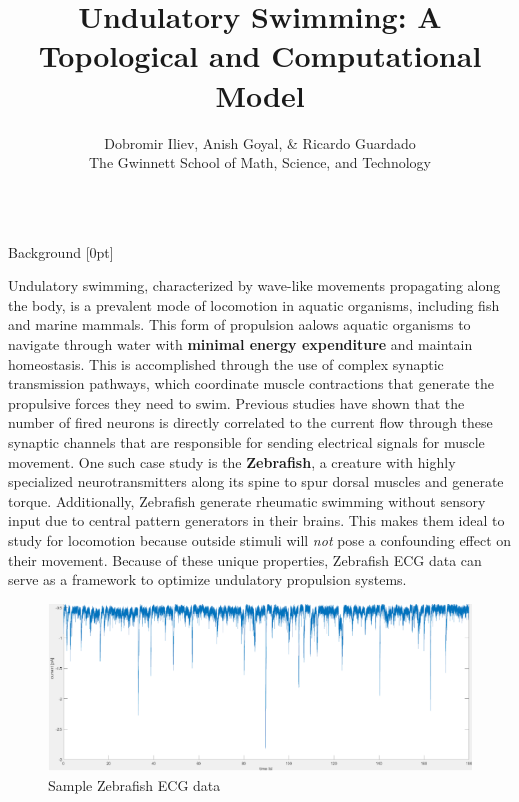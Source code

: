 \documentclass[final, 16pt]{beamer}
\title{Undulatory Swimming: A Topological and Computational Model}
\author{Dobromir Iliev, Anish Goyal, \& Ricardo Guardado \\\normalfont The Gwinnett School of Math, Science, and Technology}
\newlength{\colwidth}
\begin{document}
\setlength{\columnsep}{50pt}

\begin{frame}[t]
\centering
\vspace*{-0.5cm}
\begin{columns}[t]
\margincolumn

\fontsize{22}{26}\selectfont

\begin{column}{\colwidth}
  \fontsize{22}{24}\selectfont

  \begin{block}{Background}
    [0pt]

    Undulatory swimming, characterized by wave-like movements propagating along the body, is a prevalent mode of locomotion in aquatic organisms, including fish and marine mammals. This form of propulsion aalows aquatic organisms to navigate through water with \textbf{minimal energy expenditure} and maintain homeostasis. This is accomplished through the use of complex synaptic transmission pathways, which coordinate muscle contractions that generate the propulsive forces they need to swim. Previous studies have shown that the number of fired neurons is directly correlated to the current flow through these synaptic channels that are responsible for sending electrical signals for muscle movement. One such case study is the \textbf{Zebrafish}, a creature with highly specialized neurotransmitters along its spine to spur dorsal muscles and generate torque. Additionally, Zebrafish generate rheumatic swimming without sensory input due to central pattern generators in their brains. This makes them ideal to study for locomotion because outside stimuli will \emph{not} pose a confounding effect on their movement. Because of these unique properties, Zebrafish ECG data can serve as a framework to optimize undulatory propulsion systems.

    \begin{multicols}{2}
      \begin{figure}[H]
        \centering
        \includegraphics[width=0.95\linewidth, height=0.65\linewidth]{img/ECG_Data.png}
        \caption{Sample Zebrafish ECG data}
        \label{fig:ecg-data}
      \end{figure}
      

\end{multicols}
\end{block}
\end{column}
\end{columns}
\end{frame}
\end{document}
